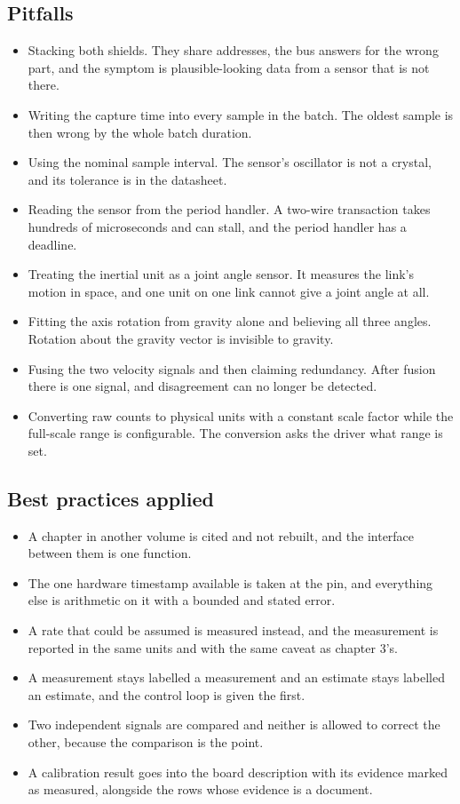 \subsection*{Pitfalls}

\begin{itemize}
\item Stacking both shields. They share addresses, the bus answers for the wrong
part, and the symptom is plausible-looking data from a sensor that is not there.
\item Writing the capture time into every sample in the batch. The oldest sample
is then wrong by the whole batch duration.
\item Using the nominal sample interval. The sensor's oscillator is not a
crystal, and its tolerance is in the datasheet.
\item Reading the sensor from the period handler. A two-wire transaction takes
hundreds of microseconds and can stall, and the period handler has a deadline.
\item Treating the inertial unit as a joint angle sensor. It measures the link's
motion in space, and one unit on one link cannot give a joint angle at all.
\item Fitting the axis rotation from gravity alone and believing all three
angles. Rotation about the gravity vector is invisible to gravity.
\item Fusing the two velocity signals and then claiming redundancy. After fusion
there is one signal, and disagreement can no longer be detected.
\item Converting raw counts to physical units with a constant scale factor while
the full-scale range is configurable. The conversion asks the driver what range
is set.
\end{itemize}

\subsection*{Best practices applied}

\begin{itemize}
\item A chapter in another volume is cited and not rebuilt, and the interface
between them is one function.
\item The one hardware timestamp available is taken at the pin, and everything
else is arithmetic on it with a bounded and stated error.
\item A rate that could be assumed is measured instead, and the measurement is
reported in the same units and with the same caveat as chapter 3's.
\item A measurement stays labelled a measurement and an estimate stays labelled
an estimate, and the control loop is given the first.
\item Two independent signals are compared and neither is allowed to correct the
other, because the comparison is the point.
\item A calibration result goes into the board description with its evidence
marked as measured, alongside the rows whose evidence is a document.
\end{itemize}


